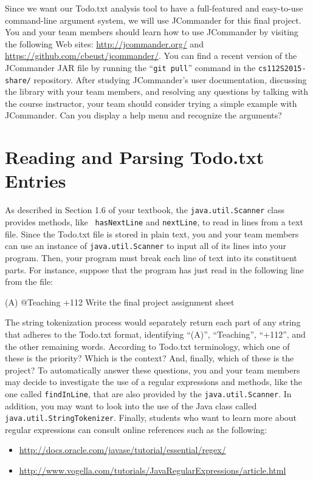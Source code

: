Since we want our Todo.txt analysis tool to have a full-featured and easy-to-use command-line argument system, we will
use JCommander for this final project.  You and your team members should learn how to use JCommander by visiting the
following Web sites: \url{http://jcommander.org/} and \url{https://github.com/cbeust/jcommander/}. You can find a
recent version of the JCommander JAR file by running the ``{\tt git pull}'' command in the {\tt cs112S2015-share/}
repository.  After studying JCommander's user documentation, discussing the library with your team members, and
resolving any questions by talking with the course instructor, your team should consider trying a simple example with
JCommander. Can you display a help menu and recognize the arguments?

\section*{Reading and Parsing Todo.txt Entries}

  As described in Section 1.6 of your textbook, the {\tt java.util.Scanner} class provides methods, like {\tt
  hasNextLine} and {\tt nextLine}, to read in lines from a text file.  Since the Todo.txt file is stored in plain text,
  you and your team members can use an instance of {\tt java.util.Scanner} to input all of its lines into your program.
  Then, your program must break each line of text into its constituent parts.  For instance, suppose that the program
  has just read in the following line from the file:

  (A) @Teaching +112 Write the final project assignment sheet

  The string tokenization process would separately return each part of any string that adheres to the Todo.txt format,
  identifying ``(A)'', ``Teaching'', ``+112'', and the other remaining words. According to Todo.txt terminology, which
  one of these is the priority?  Which is the context?  And, finally, which of these is the project?  To automatically
  answer these questions, you and your team members may decide to investigate the use of a regular expressions and
  methods, like the one called {\tt findInLine}, that are also provided by the {\tt java.util.Scanner}. In addition, you
  may want to look into the use of the Java class called {\tt java.util.StringTokenizer}. Finally, students who want to
  learn more about regular expressions can consult online references such as the following:

  \vspace*{-.25in}
  \begin{itemize}
    \itemsep0in
    \item \url{http://docs.oracle.com/javase/tutorial/essential/regex/}
    \item \url{http://www.vogella.com/tutorials/JavaRegularExpressions/article.html}
  \end{itemize}

